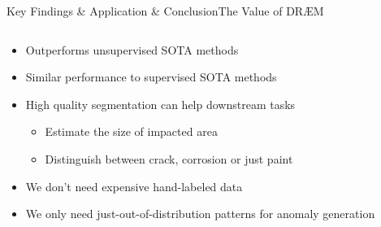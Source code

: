 \begin{frame}{Key Findings \& Application \& Conclusion}{The Value of DRÆM}
    \begin{columns}
        \begin{column}{0.5\textwidth}
            \begin{itemize}[<+->]
                \item Outperforms unsupervised SOTA methods
                \item Similar performance to supervised SOTA methods
                \item High quality segmentation can help downstream tasks
                \begin{itemize}
                    \item Estimate the size of impacted area
                    \item Distinguish between crack, corrosion or just paint
                \end{itemize}
                \item We don't need expensive hand-labeled data
                \item We only need just-out-of-distribution patterns for anomaly generation
            \end{itemize}
        \end{column}
        \begin{column}{0.5\textwidth}
        \end{column}
    \end{columns}
\end{frame}

